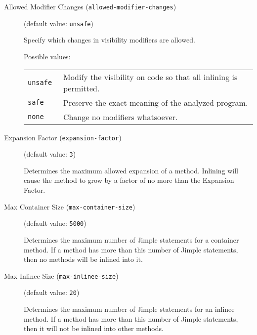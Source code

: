 \documentclass{article}
\begin{document}
\begin{description}
\item[Allowed Modifier Changes ({\tt allowed-modifier-changes})]
(default value: {\tt unsafe})




Specify which changes in visibility modifiers
are allowed.  




Possible values:\\
\begin{longtable}{p{1in}p{4in}}

{\tt unsafe }
&

Modify the visibility on code so that all inlining is permitted.
\\

{\tt safe }
&

Preserve the exact meaning of the analyzed program.
\\

{\tt none }
&

Change no modifiers whatsoever.
\\

\end{longtable}


\item[Expansion Factor ({\tt expansion-factor})]
(default value: {\tt 3})




Determines the maximum allowed expansion of a method.  Inlining
will cause the method to grow by a factor of no more than
the Expansion Factor.



\item[Max Container Size ({\tt max-container-size})]
(default value: {\tt 5000})




Determines the maximum number of Jimple statements for a container
method.  If a method has more than this number of Jimple statements,
then no methods will be inlined into it.
                        


\item[Max Inlinee Size ({\tt max-inlinee-size})]
(default value: {\tt 20})




Determines the maximum number of Jimple statements for an inlinee
method.  If a method has more than this number of Jimple statements,
then it will not be inlined into other methods.
                        


\end{description}
\end{document}
